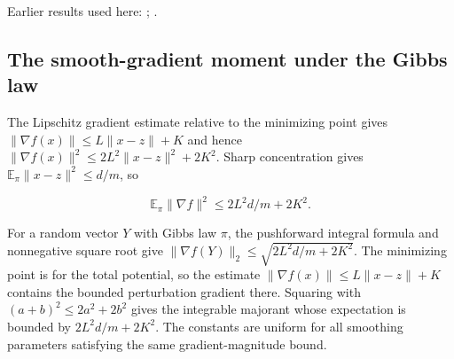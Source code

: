 \documentclass[11pt,a4paper]{report}
\begin{document}
Earlier results used here: \cite[Section~3.13.2]{LangevinLean2026ULASC}; \cite[Section~3.13.3]{LangevinLean2026ULASC}.
\subsection{\texorpdfstring{The smooth-gradient moment under the Gibbs law}{The smooth-gradient moment under the Gibbs law}}
\label{report-step-ProximalLangevin-SplittingMoments-lean-4}


The Lipschitz gradient estimate relative to the minimizing point gives \(\|\nabla f(x)\|\le L\|x-z\|+K\) and hence \(\|\nabla f(x)\|^2\le2L^2\|x-z\|^2+2K^2\). Sharp concentration gives \(\mathbb E_\pi\|x-z\|^2\le d/m\), so

\[\mathbb E_\pi\|\nabla f\|^2\le2L^2d/m+2K^2.\]

For a random vector \(Y\) with Gibbs law \(\pi\), the pushforward integral formula and nonnegative square root give \(\|\nabla f(Y)\|_2\le\sqrt{2L^2d/m+2K^2}\). The minimizing point is for the total potential, so the estimate \(\|\nabla f(x)\|\le L\|x-z\|+K\) contains the bounded perturbation gradient there. Squaring with \((a+b)^2\le2a^2+2b^2\) gives the integrable majorant whose expectation is bounded by \(2L^2d/m+2K^2\). The constants are uniform for all smoothing parameters satisfying the same gradient-magnitude bound.
\end{document}
